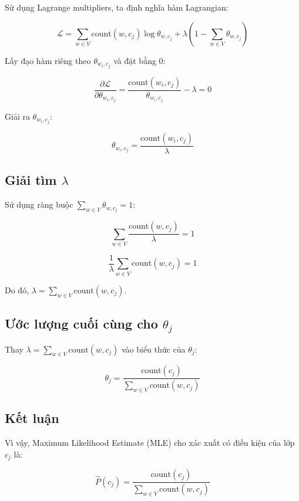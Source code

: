 \documentclass[a4paper, 15pt]{article}
\begin{document}
Sử dụng Lagrange multipliers, ta định nghĩa hàm Lagrangian:

\[
    \mathcal{L} = \sum_{w \in V} \text{count}(w, c_j) \log \theta_{w, c_j} + \lambda \left( 1 - \sum_{w \in V} \theta_{w, c_j} \right)
\]

Lấy đạo hàm riêng theo \( \theta_{w_i, c_j} \) và đặt bằng 0:

\[
    \frac{\partial \mathcal{L}}{\partial \theta_{w_i, c_j}} = \frac{\text{count}(w_i, c_j)}{\theta_{w_i, c_j}} - \lambda = 0
\]

Giải ra \( \theta_{w_i, c_j} \):

\[
    \theta_{w_i, c_j} = \frac{\text{count}(w_i, c_j)}{\lambda}
\]

\subsection*{Giải tìm \( \lambda \)}

Sử dụng ràng buộc \( \sum_{w \in V} \theta_{w, c_j} = 1 \):

\[
    \sum_{w \in V} \frac{\text{count}(w, c_j)}{\lambda} = 1
\]

\[
    \frac{1}{\lambda} \sum_{w \in V} \text{count}(w, c_j) = 1
\]

Do đó, \( \lambda = \sum_{w \in V} \text{count}(w, c_j) \).

\subsection*{Ước lượng cuối cùng cho \( \theta_j \)}

Thay \( \lambda = \sum_{w \in V} \text{count}(w, c_j) \) vào biểu thức của \( \theta_j \):

\[
    \theta_j = \frac{\text{count}(c_j)}{\sum_{w \in V} \text{count}(w, c_j)}
\]

\subsection*{Kết luận}

Vì vậy, Maximum Likelihood Estimate (MLE) cho xác xuất có điều kiện của lớp \( c_j \) là:

\[
    \hat{P}(c_j) = \frac{\text{count}(c_j)}{\sum_{w \in V} \text{count}(w, c_j)}
\]
\end{document}
